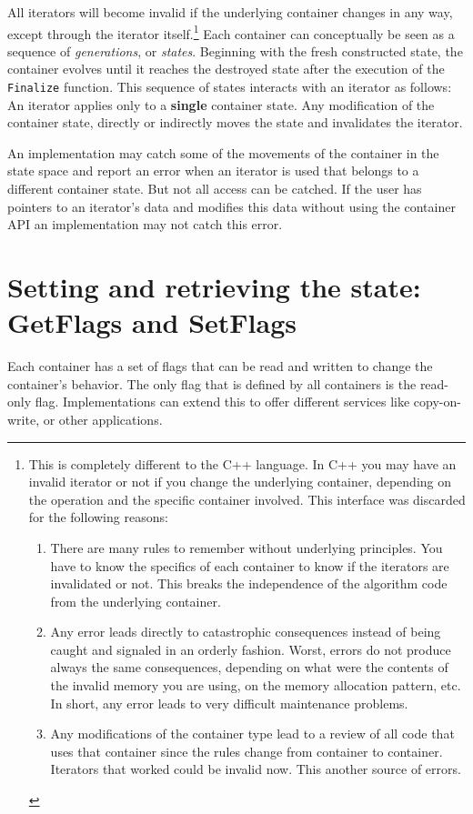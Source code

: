 \documentclass[12pt,a4paper]{memoir} %
\begin{document}
All iterators will become invalid if the underlying container changes in any way, except through the iterator itself.\footnote{This is completely 
different to the C++ language. In C++ you may have an invalid iterator or not if you change the underlying container, depending on the 
operation and the specific container involved. This interface was discarded for the following reasons:
\begin{enumerate}
\item There are many rules to remember without underlying principles.
  You have to know the specifics of each container to know
  if the iterators are invalidated or not. This breaks the independence
   of the algorithm code from the underlying container.

\item Any error leads directly to catastrophic consequences instead
   of being caught and signaled in an orderly fashion. Worst, errors
   do not produce always the same consequences, depending on what
   were the contents of the invalid memory you are using, on the
   memory allocation pattern, etc. In short, any error leads to
   very difficult maintenance problems.

\item Any modifications of the container type lead to a review of
   all code that uses that container since the rules change from
   container to container. Iterators that worked could be invalid
   now. This another source of errors.
\end{enumerate}
}
Each container can conceptually be seen as a sequence of \textsl{generations}, or \textsl{states}. Beginning with the fresh constructed state, the container
evolves until it reaches the destroyed state after the execution of the \verb,Finalize, function. This sequence of states interacts with an
iterator as follows: An iterator applies only to a \textbf{single} container state. Any modification of the container state, directly or
indirectly moves the state and invalidates the iterator.

An implementation may catch some of the movements of the container in the state space and report an error when an iterator is used that belongs to 
a different container state. But not all access can be catched. If the user has pointers to an iterator's data and modifies this data without
using the container API an implementation may not catch this error.

\section{Setting and retrieving the state: GetFlags and SetFlags}
Each container has a set of flags that can be read and written to change the container's behavior. The only flag that is defined by all containers
is the read-only flag. Implementations can extend this to offer different services like copy-on-write, or other applications. 
\end{document}
